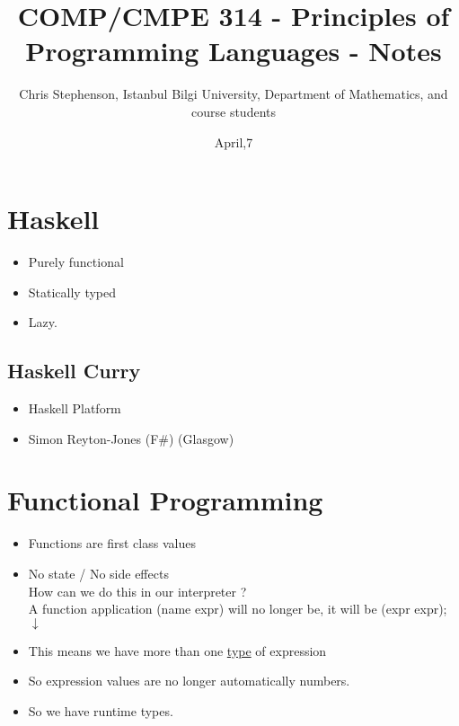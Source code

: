 \documentclass{article}
\begin{document}
\title{COMP/CMPE 314 - Principles of Programming Languages - Notes}
\author{Chris Stephenson, Istanbul Bilgi University, Department of Mathematics, and course students}
\date{April,7}
\maketitle

\section{Haskell}
\begin{flushleft}
\begin{itemize}
\item Purely functional 
\item Statically typed 
\item Lazy.
\end{itemize}
\end{flushleft}

\subsection*{Haskell Curry}
\begin{flushleft}
\begin{itemize}
\item Haskell Platform
\item Simon Reyton-Jones (F\#) (Glasgow) 
\end{itemize}
\end{flushleft}

\section{Functional Programming}
\begin{flushleft}
\begin{itemize}
\item Functions are first class values
\item No state / No side effects\\
\doublespacing
How can we do this in our interpreter ?\\
A function application (name expr) will no longer be, it will be (expr expr);\\
$\downarrow$
\item This means we have more than one \underline{type} of expression
\item So expression values are no longer automatically numbers.
\item So we have runtime types.
\end{itemize}
\end{flushleft}
\end{document}
